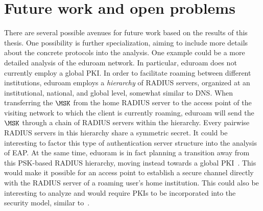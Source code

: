 \section{Future work and open problems}\label{sec:conclusions:future_work}

There are several possible avenues for future work based on the results of this thesis.
One possibility is further specialization,
aiming to include more details about the concrete protocols into the analysis.
One example could be a more detailed analysis of the eduroam network.
In particular,
eduroam does not currently employ a global PKI.
In order to facilitate roaming between different institutions,
eduroam employs a \emph{hierarchy} of RADIUS servers,
organized at an institutional, national, and global level,
somewhat similar to DNS.
When transferring the $\MSK$ from the home RADIUS server to the access point of the visiting network to which the client is currently roaming,
eduroam will send the $\MSK$ through a chain of RADIUS servers within the hierarchy.
Every pairwise RADIUS servers in this hierarchy share a symmetric secret.
It could be interesting to factor this type of authentication server structure into the analysis of EAP.
At the same time,
eduoram is in fact planning a transition away from this PSK-based RADIUS hierarchy,
moving instead towards a global PKI~\cite{IETF:RFC7593:eduroam_architecture}.
This would make it possible for an access point to establish a secure channel directly with the RADIUS server of a roaming user's home institution.
This could also be interesting to analyze and would require PKIs to be incorporated into the security model,
similar to~\cite{ESORICS:BCFPPS13}. 



%


